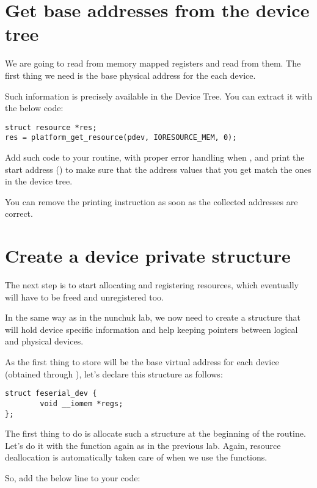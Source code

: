 \section{Get base addresses from the device tree}

We are going to read from memory mapped registers and read from them.
The first thing we need is the base physical address for the each
device.

Such information is precisely available in the Device Tree. You can
extract it with the below code:

\begin{verbatim}
struct resource *res;
res = platform_get_resource(pdev, IORESOURCE_MEM, 0);
\end{verbatim}

Add such code to your  routine, with proper error
handling when , and print the start address
() to make sure that the address values that
you get match the ones in the device tree. 

You can remove the printing instruction as soon as the collected
addresses are correct.

\section{Create a device private structure}

The next step is to start allocating and registering resources,
which eventually will have to be freed and unregistered too.

In the same way as in the nunchuk lab, we now need to create a
structure that will hold device specific information and help
keeping pointers between logical and physical devices.

As the first thing to store will be the base virtual address for
each device (obtained through ), let's declare this
structure as follows:

\begin{verbatim}
struct feserial_dev {
        void __iomem *regs;
};
\end{verbatim}

The first thing to do is allocate such a structure at the beginning
of the  routine. Let's do it with the 
function again as in the previous lab. Again, resource deallocation is
automatically taken care of when we use the  functions.

So, add the below line to your code:

